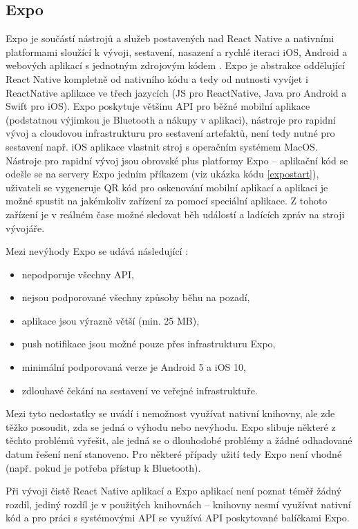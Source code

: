 \subsection{Expo}

Expo je součástí nástrojů a služeb postavených nad React Native a nativními platformami sloužící k vývoji, sestavení, nasazení a rychlé iteraci iOS, Android a webových aplikací s jednotným zdrojovým kódem \cite{Vatne2020}. Expo je abstrakce oddělující React Native kompletně od nativního kódu a tedy od nutnosti vyvíjet i ReactNative aplikace ve třech jazycích (JS pro ReactNative, Java pro Android a Swift pro iOS). Expo poskytuje většinu API pro běžné mobilní aplikace (podstatnou výjimkou je Bluetooth a nákupy v aplikaci), nástroje pro rapidní vývoj a cloudovou infrastrukturu pro sestavení artefaktů, není tedy nutné pro sestavení např. iOS aplikace vlastnit stroj s operačním systémem MacOS. Nástroje pro rapidní vývoj jsou obrovské plus platformy Expo -- aplikační kód se odešle se na servery Expo jedním příkazem (viz ukázka kódu \ref{expostart}), uživateli se vygeneruje QR kód pro oskenování mobilní aplikací a aplikaci je možné spustit na jakémkoliv zařízení za pomocí speciální aplikace. Z tohoto zařízení je v reálném čase možné sledovat běh událostí a ladících zpráv na stroji vývojáře. 

Mezi nevýhody Expo se udává následující \cite{Ovchinnikova2020}:

\begin{itemize}
	\item nepodporuje všechny API,
	\item nejsou podporované všechny způsoby běhu na pozadí,
	\item aplikace jsou výrazně větší (min. 25 MB),
	\item push notifikace jsou možné pouze přes infrastrukturu Expo,
	\item minimální podporovaná verze je Android 5 a iOS 10,
	\item zdlouhavé čekání na sestavení ve veřejné infrastruktuře.
\end{itemize}

Mezi tyto nedostatky se uvádí i nemožnost využívat nativní knihovny, ale zde těžko posoudit, zda se jedná o výhodu nebo nevýhodu. Expo slibuje některé z těchto problémů vyřešit, ale jedná se o dlouhodobé problémy a žádné odhadované datum řešení není stanoveno. Pro některé případy užití tedy Expo není vhodné (např. pokud je potřeba přístup k Bluetooth).

Při vývoji čistě React Native aplikací a Expo aplikací není poznat téměř žádný rozdíl, jediný rozdíl je v použitých knihovnách -- knihovny nesmí využívat nativní kód a pro práci s systémovými API se využívá API poskytované balíčkami Expo.

